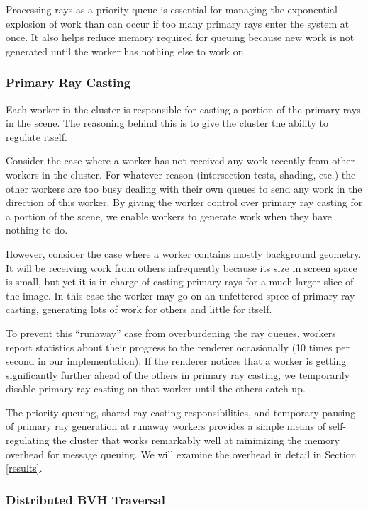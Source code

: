 \documentclass[a4paper,twoside]{article}
\begin{document}
Processing rays as a priority queue is essential for managing the exponential
explosion of work than can occur if too many primary rays enter the system at
once. It also helps reduce memory required for queuing because new work is not
generated until the worker has nothing else to work on.

\subsubsection{Primary Ray Casting}
\label{primaryrays}

Each worker in the cluster is responsible for casting a portion of the primary
rays in the scene. The reasoning behind this is to give the cluster the ability
to regulate itself.

Consider the case where a worker has not received any work recently from other
workers in the cluster. For whatever reason (intersection tests, shading, etc.)
the other workers are too busy dealing with their own queues to send any work
in the direction of this worker. By giving the worker control over primary ray
casting for a portion of the scene, we enable workers to generate work when
they have nothing to do.

However, consider the case where a worker contains mostly background
geometry. It will be receiving work from others infrequently because its size
in screen space is small, but yet it is in charge of casting primary rays for
a much larger slice of the image. In this case the worker may go on an
unfettered spree of primary ray casting, generating lots of work for others and
little for itself.

To prevent this ``runaway'' case from overburdening the ray queues, workers
report statistics about their progress to the renderer occasionally (10 times
per second in our implementation). If the renderer notices that a worker is
getting significantly further ahead of the others in primary ray casting, we
temporarily disable primary ray casting on that worker until the others catch
up.

The priority queuing, shared ray casting responsibilities, and temporary pausing
of primary ray generation at runaway workers provides a simple means of
self-regulating the cluster that works remarkably well at minimizing the memory
overhead for message queuing. We will examine the overhead in detail in Section
\ref{results}.

\subsubsection{Distributed BVH Traversal}
\label{traversal}
\end{document}

